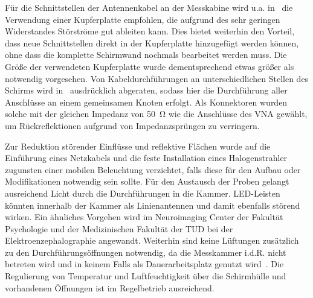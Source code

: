 Für die Schnittstellen der Antennenkabel an der Messkabine wird u.a. in~\cite{EM_Schirmung, EMV} die Verwendung einer Kupferplatte empfohlen, die aufgrund des sehr geringen Widerstandes Störströme gut ableiten kann. Dies bietet weiterhin den Vorteil, dass neue Schnittstellen direkt in der Kupferplatte hinzugefügt werden \mbox{können}, ohne dass die komplette Schirmwand nochmals bearbeitet werden muss. Die Größe der verwendeten Kupferplatte wurde dementsprechend etwas größer als notwendig vorgesehen. Von Kabeldurchführungen an unterschiedlichen Stellen des Schirms wird in~\cite{EM_Schirmung, EMV, Design_of_shielded_enclosures} ausdrücklich abgeraten, sodass hier die Durchführung aller Anschlüsse an einem gemeinsamen Knoten erfolgt. Als Konnektoren wurden solche mit der gleichen Impedanz von \SI{50}{\ohm} wie die Anschlüsse des \ac{VNA} gewählt, um Rückreflektionen aufgrund von Impedanzsprüngen zu verringern. 
\par
\vspace{\linespace}
Zur Reduktion störender Einflüsse und reflektive Flächen wurde auf die Einführung eines Netzkabels und die feste Installation eines Halogenstrahler zugunsten einer mobilen Beleuchtung verzichtet, falls diese für den Aufbau oder Modifikationen notwendig sein sollte. Für den Austausch der Proben gelangt ausreichend Licht durch die Durchführungen in die Kammer. LED-Leisten könnten innerhalb der Kammer als Linienantennen und damit ebenfalls störend wirken. Ein ähnliches Vorgehen wird im Neuroimaging Center der Fakultät Psychologie und der Medizinischen Fakultät der TUD bei der Elektro\-enzephalo\-graphie angewandt. Weiterhin sind keine Lüftungen zusätzlich zu den Durchführungsöffnungen notwendig, da die Messkammer i.d.R. nicht betreten wird und in keinem Falls als Dauerarbeitsplatz genutzt wird~\cite{EM_Schirmung}. Die Regulierung von Temperatur und Luftfeuchtigkeit über die Schirmhülle und vorhandenen Öffnungen ist im Regelbetrieb ausreichend.  

    
\par
\vspace{\linespace}

